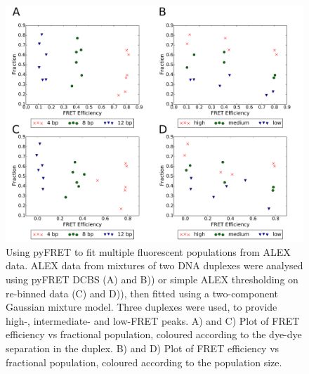 \begin{figure}[!ht]
   \begin{center}
      \includegraphics*[clip=true, width=6in]{pyFRET/ratios.pdf}
      \caption{Using pyFRET to fit multiple fluorescent populations from ALEX data. ALEX data from mixtures of two DNA duplexes were analysed using pyFRET DCBS (A) and B)) or simple ALEX thresholding on re-binned data (C) and D)), then fitted using a two-component Gaussian mixture model. Three duplexes were used, to provide high-, intermediate- and low-FRET peaks. A) and C) Plot of FRET efficiency vs fractional population, coloured according to the dye-dye separation in the duplex. B) and D) Plot of FRET efficiency vs fractional population, coloured according to the population size.}
      \label{fig:ratios}
   \end{center}
\end{figure}

